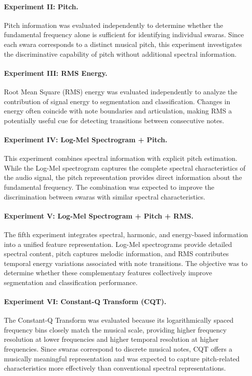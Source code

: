 \paragraph{Experiment II: Pitch.} Pitch information was evaluated independently to determine whether the fundamental frequency alone is sufficient for identifying individual swaras. Since each swara corresponds to a distinct musical pitch, this experiment investigates the discriminative capability of pitch without additional spectral information.

\paragraph{Experiment III: RMS Energy.} Root Mean Square (RMS) energy was evaluated independently to analyze the contribution of signal energy to segmentation and classification. Changes in energy often coincide with note boundaries and articulation, making RMS a potentially useful cue for detecting transitions between consecutive notes.

\paragraph{Experiment IV: Log-Mel Spectrogram + Pitch.} This experiment combines spectral information with explicit pitch estimation. While the Log-Mel spectrogram captures the complete spectral characteristics of the audio signal, the pitch representation provides direct information about the fundamental frequency. The combination was expected to improve the discrimination between swaras with similar spectral characteristics.

\paragraph{Experiment V: Log-Mel Spectrogram + Pitch + RMS.} The fifth experiment integrates spectral, harmonic, and energy-based information into a unified feature representation. Log-Mel spectrograms provide detailed spectral content, pitch captures melodic information, and RMS contributes temporal energy variations associated with note transitions. The objective was to determine whether these complementary features collectively improve segmentation and classification performance.

\paragraph{Experiment VI: Constant-Q Transform (CQT).} The Constant-Q Transform was evaluated because its logarithmically spaced frequency bins closely match the musical scale, providing higher frequency resolution at lower frequencies and higher temporal resolution at higher frequencies. Since swaras correspond to discrete musical notes, CQT offers a musically meaningful representation and was expected to capture pitch-related characteristics more effectively than conventional spectral representations.

